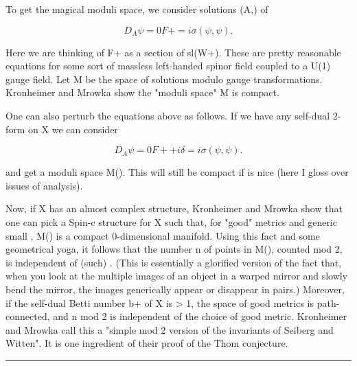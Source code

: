 To get the magical moduli space, we consider solutions (A,\psi ) of


$$

                       D_A \psi  = 0
                       F+ = i \sigma (\psi ,\psi ).
$$
    

Here we are thinking of F+ as a section of sl(W+).  These are pretty
reasonable equations for some sort of massless left-handed spinor field
coupled to a U(1) gauge field.  Let M be the space of solutions modulo
gauge transformations.  Kronheimer and Mrowka show the "moduli space" M
is compact.   

One can also perturb the equations above as follows.  If we have
any self-dual 2-form \delta  on X we can consider


$$

                       D_A \psi  = 0
                       F+ + i \delta  = i \sigma (\psi ,\psi ).
$$
    

and get a moduli space M(\delta ).  This will still be compact if \delta  is
nice (here I gloss over issues of analysis).  

Now, if X has an almost complex structure, Kronheimer and Mrowka show
that one can pick a Spin-c structure for X such that, for "good" metrics
and generic small \delta , M(\delta ) is a compact 0-dimensional manifold.
Using this fact and some geometrical yoga, it follows that the number n of
points in M(\delta ), counted mod 2, is independent of (such) \delta .
(This is essentially a glorified version of the fact that, when you look
at the multiple images of an object in a warped mirror and slowly bend
the mirror, the images generically appear or disappear in pairs.)
Moreover, if the self-dual Betti number b+ of X is > 1, the space of
good metrics is path-connected, and n mod 2 is independent of the choice
of good metric.  Kronheimer and Mrowka call this a "simple mod 2 version
of the invariants of Seiberg and Witten".  It is one ingredient of their
proof of the Thom conjecture.  
\par\noindent\rule{\textwidth}{0.4pt}

